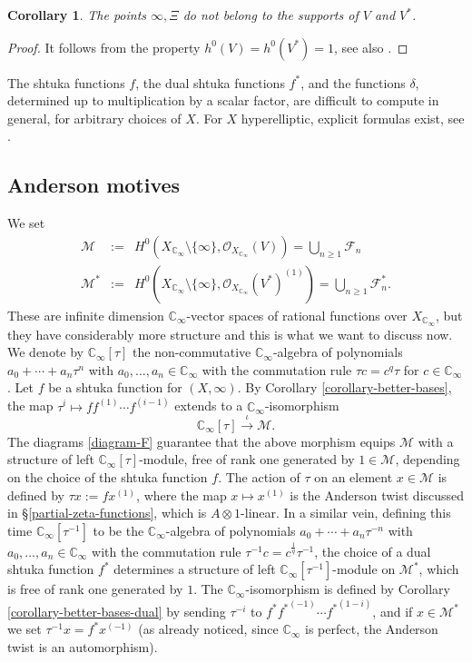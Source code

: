 \documentclass[11pt]{amsart}
\numberwithin{equation}{section}
\newcommand{\CC}{\mathbb{C}}
\newtheorem{Corollary}[Theorem]{Corollary}
\begin{document}
\begin{Corollary}
The points $\infty,\Xi$ do not belong to the supports of $V$ and $V^*$.
\end{Corollary}
\begin{proof}
It follows from the property $h^0(V)=h^0(V^*)=1$, see also \cite[Corollary 0.3.3]{THA-1}.
\end{proof}
The shtuka functions $f$, the dual shtuka functions $f^*$, and the functions $\delta$, determined up to multiplication by a scalar factor, are difficult to compute in general, for arbitrary choices of $X$. For $X$ hyperelliptic, explicit formulas exist, see \cite{FER1}.

\subsection{Anderson motives}

We set 
\begin{eqnarray*}
\mathcal{M}&:=& H^0(X_{\CC_\infty}\setminus\{\infty\},\mathcal{O}_{X_{\CC_\infty}}(V))=\bigcup_{n\geq1}\mathcal{F}_n\\ \mathcal{M}^*&:=& H^0(X_{\CC_\infty}\setminus\{\infty\},\mathcal{O}_{X_{\CC_\infty}}(V^*)^{(1)})=\bigcup_{n\geq1}\mathcal{F}_n^*.
\end{eqnarray*}
These are infinite dimension $\CC_\infty$-vector spaces of rational functions over $X_{\CC_\infty}$, but they have considerably more structure
and this is what we want to discuss now. We denote by $\CC_\infty[\tau]$ the non-commutative $\CC_\infty$-algebra of polynomials $a_0+\cdots+a_n\tau^n$ with $a_0,\ldots,a_n\in\CC_\infty$ with the commutation rule $\tau c=c^q\tau$
for $c\in\CC_\infty$. Let $f$ be a shtuka function for $(X,\infty)$. By Corollary \ref{corollary-better-bases}, the map $\tau^i\mapsto ff^{(1)}\cdots f^{(i-1)}$
extends to a $\CC_\infty$-isomorphism
\begin{equation}\label{iota-iso}
\CC_\infty[\tau]\xrightarrow{\iota}\mathcal{M}.
\end{equation}
The diagrams \eqref{diagram-F} guarantee that the above morphism equips $\mathcal{M}$ with a structure of left $\CC_\infty[\tau]$-module, free of rank one generated by $1\in\mathcal{M}$, depending on the choice of the shtuka function $f$. The action of $\tau$ on an element $x\in\mathcal{M}$ is defined by $\tau x:=fx^{(1)}$, where the map $x\mapsto x^{(1)}$ is the Anderson twist discussed in \S \ref{partial-zeta-functions}, which is $A\otimes1$-linear. In a similar vein, defining this time $\CC_\infty[\tau^{-1}]$
to be the $\CC_\infty$-algebra of polynomials $a_0+\cdots+a_n\tau^{-n}$ with $a_0,\ldots,a_n\in\CC_\infty$ with the commutation rule $\tau^{-1} c=c^\frac{1}{q}\tau^{-1}$, the choice of a dual shtuka function $f^*$ determines a structure of left
$\CC_\infty[\tau^{-1}]$-module on $\mathcal{M}^*$, which is free of rank one generated by $1$. The $\CC_\infty$-isomorphism
is defined by Corollary \ref{corollary-better-bases-dual} by sending $\tau^{-i}$ to ${f^*}{f^*}^{(-1)}\cdots {f^*}^{(1-i)}$, 
and if $x\in\mathcal{M}^*$ we set $\tau^{-1}x=f^*x^{(-1)}$ (as already noticed, since $\CC_\infty$ is perfect, the Anderson twist is an automorphism).
\end{document}
